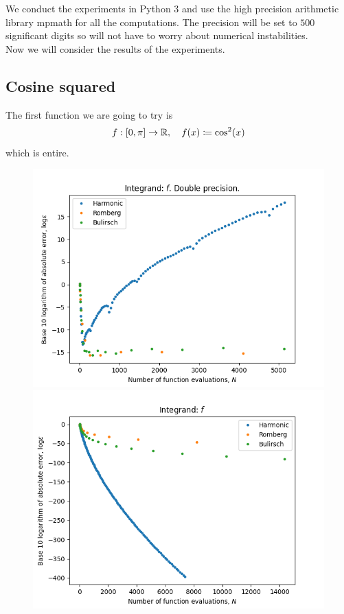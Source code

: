We conduct the experiments in Python 3 and use the high precision arithmetic library mpmath for all the computations. The precision will be set to \(500\) significant digits so will not have to worry about numerical instabilities.\\

Now we will consider the results of the experiments.

\subsection{Cosine squared}
The first function we are going to try is
\[
f: [0, \pi]\rightarrow \mathbb{R}, \quad f(x) \coloneqq \cos^2(x)
\]
which is entire.

\begin{figure}[H]
\centering
\begin{minipage}{0.45\textwidth}
\centering
\includegraphics[scale=0.45]{../results/romberg_plots/cos_squared.png}
\end{minipage}
\begin{minipage}{0.45\textwidth}
\centering
\includegraphics[scale=0.45]{../results/romberg_plots/cos_squared_hp.png}
\end{minipage}
\end{figure}

